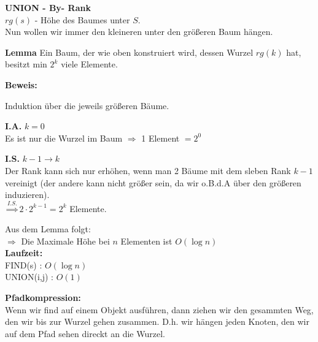 \begin{description}

\item{\bfseries UNION - By- Rank}\\
$rg(s)$ - Höhe des Baumes unter $S$.\\

Nun wollen wir immer den kleineren unter den größeren Baum hängen.

\item{\bfseries Lemma} Ein Baum, der wie oben konstruiert wird, dessen Wurzel $rg(k)$ hat, besitzt min $2^k$ viele Elemente.

\item{\bfseries Beweis:}

\begin{description}

Induktion über die jeweils größeren Bäume.

\item{\bfseries I.A.} $k=0$\\
Es ist nur die Wurzel im Baum $\Rightarrow$ 1 Element $= 2^0$

\item{\bfseries I.S.} $k-1 \longrightarrow k$\\
Der Rank kann sich nur erhöhen, wenn man 2 Bäume mit dem sleben Rank $k-1$ vereinigt (der andere kann nicht größer sein, da wir o.B.d.A über den größeren induzieren).\\

$\stackrel{I.S.}{\Longrightarrow} 2 \cdot 2^{k-1} = 2^k$ Elemente.

\end{description}

Aus dem Lemma folgt:\\
$\Rightarrow$ Die Maximale Höhe bei $n$ Elementen ist $ O (\log n)$\\

\textbf{Laufzeit:}\\
FIND(s) : $O(\log n)$\\
UNION(i,j) : $O(1)$

\item{\bfseries Pfadkompression:}\\
Wenn wir find auf einem Objekt ausführen, dann ziehen wir den gesammten Weg, den wir bis zur Wurzel gehen zusammen. D.h. wir hängen jeden Knoten, den wir auf dem Pfad sehen direckt an die Wurzel.

\end{description}